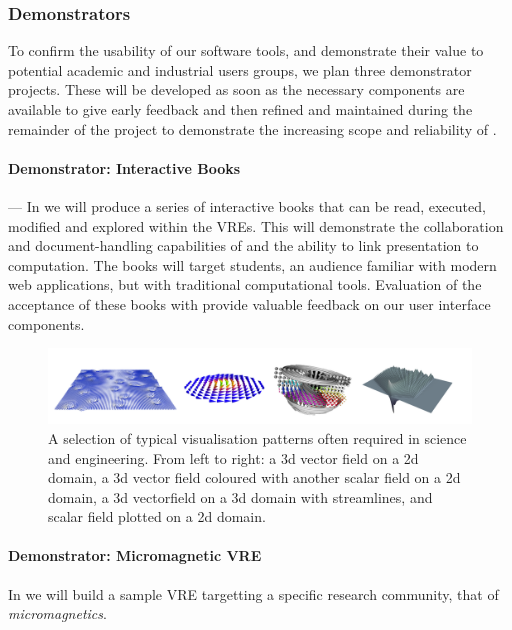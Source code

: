 \subsubsection{Demonstrators}


To confirm the usability of our software tools, and demonstrate their
value to potential academic and industrial users groups, we plan three
demonstrator projects. These will be developed as soon as the
necessary components are available to give early feedback and then
refined and maintained during the remainder of the project to
demonstrate the increasing scope and reliability of \TheProject.


\paragraph{Demonstrator: Interactive Books} ---
In   we will produce a series of interactive books
that can be read, executed, modified and explored within the
\TheProject VREs. This will demonstrate the collaboration and
document-handling capabilities of \TheProject and the ability to link
presentation to computation. The books will target students, an
audience familiar with modern web applications, but with traditional
computational tools. Evaluation of the acceptance of these books with
provide valuable feedback on our user interface components.

\begin{figure}
\includegraphics[width=1.0\textwidth]{Pictures/micromagnetic-and-3d-vis-4x1.pdf}
\caption{\label{fig:3d-plots} A selection of typical visualisation patterns often required in science and engineering. From left to right: a 3d vector field on a 2d domain, a 3d vector field coloured with another scalar field on a 2d domain, a 3d vectorfield on a 3d domain with streamlines, and scalar field plotted on a 2d domain.}
\end{figure}

\paragraph{Demonstrator: Micromagnetic VRE}
\label{sec:introduction-micromagnetic-vre-demonstrator} In
 we will build
a sample VRE targetting a specific research community, that of \textit{micromagnetics}.

